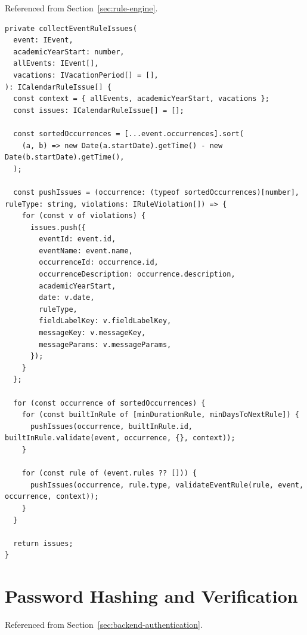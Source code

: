 Referenced from Section~\ref{sec:rule-engine}.

\begin{lstlisting}[caption={[The global rule-validation dispatcher, in full.]{The global rule-validation dispatcher, in full (\texttt{server/calendar/services/calendar.service.ts}).}}, label={lst:collect-issues-full}]
private collectEventRuleIssues(
  event: IEvent,
  academicYearStart: number,
  allEvents: IEvent[],
  vacations: IVacationPeriod[] = [],
): ICalendarRuleIssue[] {
  const context = { allEvents, academicYearStart, vacations };
  const issues: ICalendarRuleIssue[] = [];

  const sortedOccurrences = [...event.occurrences].sort(
    (a, b) => new Date(a.startDate).getTime() - new Date(b.startDate).getTime(),
  );

  const pushIssues = (occurrence: (typeof sortedOccurrences)[number], ruleType: string, violations: IRuleViolation[]) => {
    for (const v of violations) {
      issues.push({
        eventId: event.id,
        eventName: event.name,
        occurrenceId: occurrence.id,
        occurrenceDescription: occurrence.description,
        academicYearStart,
        date: v.date,
        ruleType,
        fieldLabelKey: v.fieldLabelKey,
        messageKey: v.messageKey,
        messageParams: v.messageParams,
      });
    }
  };

  for (const occurrence of sortedOccurrences) {
    for (const builtInRule of [minDurationRule, minDaysToNextRule]) {
      pushIssues(occurrence, builtInRule.id, builtInRule.validate(event, occurrence, {}, context));
    }

    for (const rule of (event.rules ?? [])) {
      pushIssues(occurrence, rule.type, validateEventRule(rule, event, occurrence, context));
    }
  }

  return issues;
}
\end{lstlisting}

\clearpage
\section{Password Hashing and Verification} \label{app:crypto}

Referenced from Section~\ref{sec:backend-authentication}.

